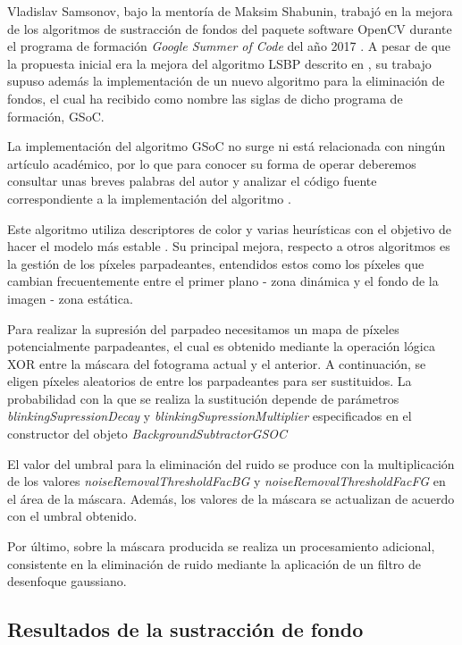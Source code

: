 Vladislav Samsonov, bajo la mentoría de Maksim Shabunin, trabajó en la mejora de los algoritmos de sustracción de fondos del paquete software OpenCV durante el programa de formación \textit{Google Summer of Code} del año 2017 \cite{gsocprojectentry}. A pesar de que la propuesta inicial era la mejora del algoritmo LSBP descrito en \cite{originallbspgsoc}, su trabajo supuso además la implementación de un nuevo algoritmo para la eliminación de fondos, el cual ha recibido como nombre las siglas de dicho programa de formación, GSoC.

La implementación del algoritmo GSoC no surge ni está relacionada con ningún artículo académico, por lo que para conocer su forma de operar deberemos consultar unas breves palabras del autor \cite{gsocbytheauthor} y analizar el código fuente correspondiente a la implementación del algoritmo \cite{gsocexplainer} \cite{gsocimplementation}.

Este algoritmo utiliza descriptores de color y varias heurísticas con el objetivo de hacer el modelo más estable \cite{gsocbytheauthor}. Su principal mejora, respecto a otros algoritmos es la gestión de los píxeles parpadeantes, entendidos estos como los píxeles que cambian frecuentemente entre el primer plano - zona dinámica y el fondo de la imagen - zona estática. 

Para realizar la supresión del parpadeo necesitamos un mapa de píxeles potencialmente parpadeantes, el cual es obtenido mediante la operación lógica XOR entre la máscara del fotograma actual y el anterior. A continuación, se eligen píxeles aleatorios de entre los parpadeantes para ser sustituidos. La probabilidad con la que se realiza la sustitución depende de parámetros \textit{blinkingSupressionDecay} y \textit{blinkingSupressionMultiplier} especificados en el constructor del objeto \textit{BackgroundSubtractorGSOC} 

El valor del umbral para la eliminación del ruido se produce con la multiplicación  de los valores \textit{noiseRemovalThresholdFacBG} y \textit{noiseRemovalThresholdFacFG} en el área de la máscara. Además, los valores de la máscara se actualizan de acuerdo con el umbral obtenido.

Por último, sobre la máscara producida se realiza un procesamiento adicional, consistente en la eliminación de ruido mediante la aplicación de un filtro de desenfoque gaussiano.

\subsection{Resultados de la sustracción de fondo} \label{sub:extraccioncontornos}

